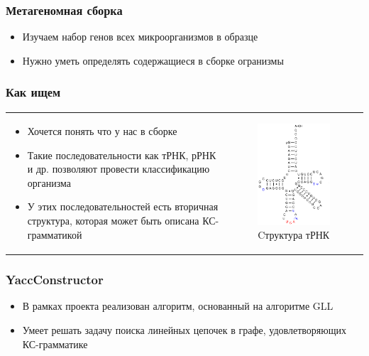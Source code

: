 \documentclass{beamer}
\begin{document}
\begin{frame}
	\frametitle{Метагеномная сборка}
	\begin{itemize}
		\item Изучаем набор генов всех микроорганизмов в образце
		\item Нужно уметь определять содержащиеся в сборке огранизмы
	\end{itemize}
\end{frame}

\begin{frame}
	\frametitle{Как ищем}
	\begin{tabular}{p{6cm} p{5cm}}
		\begin{itemize}
			\item Хочется понять что у нас в сборке
			\item Такие последовательности как тРНК, рРНК и др. позволяют провести классификацию организма
			\item У этих последовательностей есть вторичная структура, которая может быть описана КС-грамматикой
		\end{itemize}
		&
		\vspace{-1cm}
		\begin{figure}[b]
			\centering
			\includegraphics[width=5.2cm]{pictures/TRNA.png}
			\caption{Cтруктура тРНК}
		\end{figure}
	\end{tabular}  
\end{frame}

\begin{frame}
	\frametitle{YaccConstructor}
	\begin{itemize}
		\item В рамках проекта реализован алгоритм, основанный на алгоритме GLL
		\item Умеет решать задачу поиска линейных цепочек в графе, удовлетворяющих КС-грамматике
	\end{itemize}
\end{frame}
\end{document}
